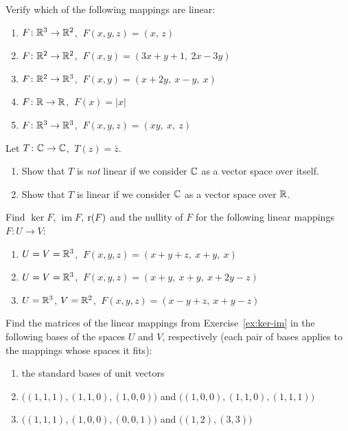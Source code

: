\begin{exercise}
Verify which of the following mappings are linear:
\begin{enumerate}[label=(\alph*)]
\item $F\colon\mathbb{R}^3\to\mathbb{R}^2$, $\ F(x,y,z) = (x,\,z)$
\item $F\colon\mathbb{R}^2\to\mathbb{R}^2$, $\ F(x,y) = (3x+y+1,\ 2x-3y)$
\item $F\colon\mathbb{R}^2\to\mathbb{R}^3$, $\ F(x,y) = (x+2y,\ x-y,\ x)$
\item $F\colon\mathbb{R}\to\mathbb{R}$, $\ F(x) = |x|$
\item $F\colon\mathbb{R}^3\to\mathbb{R}^3$, $\ F(x,y,z) = (xy,\ x,\ z)$
\end{enumerate}
\end{exercise}

\begin{exercise}
Let $T\colon\mathbb{C}\to\mathbb{C}$, $\ T(z) = \bar z$.
\begin{enumerate}[label=(\alph*)]
\item Show that $T$ is \emph{not} linear if we consider $\mathbb{C}$ as a vector space over itself.
\item Show that $T$ is linear if we consider $\mathbb{C}$ as a vector space over $\mathbb{R}$.
\end{enumerate}
\end{exercise}

\begin{exercise}\label{ex:ker-im}
Find $\ker F$, $\operatorname{im} F$, $\operatorname{r}(F)$ and the nullity of $F$ for the following linear mappings
$F\colon U\to V$:
\begin{enumerate}[label=(\alph*)]
\item $U = V = \mathbb{R}^3$, $\ F(x,y,z) = (x+y+z,\ x+y,\ x)$
\item $U = V = \mathbb{R}^3$, $\ F(x,y,z) = (x+y,\ x+y,\ x+2y-z)$
\item $U = \mathbb{R}^3$, $V = \mathbb{R}^2$, $\ F(x,y,z) = (x-y+z,\ x+y-z)$
\end{enumerate}
\end{exercise}

\begin{exercise}
Find the matrices of the linear mappings from Exercise~\ref{ex:ker-im} in the following bases of the
spaces $U$ and $V$, respectively (each pair of bases applies to the mappings whose spaces it fits):
\begin{enumerate}[label=(\alph*)]
\item the standard bases of unit vectors
\item $\big((1,1,1),(1,1,0),(1,0,0)\big)$ and $\big((1,0,0),(1,1,0),(1,1,1)\big)$
\item $\big((1,1,1),(1,0,0),(0,0,1)\big)$ and $\big((1,2),(3,3)\big)$
\end{enumerate}
\end{exercise}

